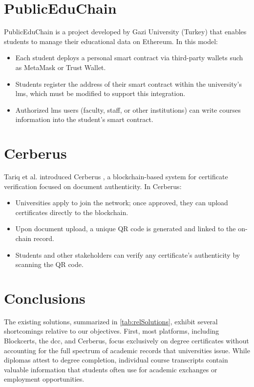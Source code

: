 \section{PublicEduChain}
PublicEduChain \cite{mustafa2024publiceduchain} is a project developed by Gazi University (Turkey) that enables students to manage their educational data on Ethereum. In this model:
\begin{itemize}
    \item Each student deploys a personal smart contract via third-party wallets such as MetaMask or Trust Wallet.
    \item Students register the address of their smart contract within the university’s \acrfull{lms}, which must be modified to support this integration.
    \item Authorized \acrshort{lms} users (faculty, staff, or other institutions) can write courses information into the student’s smart contract.
\end{itemize}

\section{Cerberus}
Tariq et al. introduced Cerberus \cite{tariq2022cerberus}, a blockchain-based system for certificate verification focused on document authenticity. In Cerberus:
\begin{itemize}
    \item Universities apply to join the network; once approved, they can upload certificates directly to the blockchain.
    \item Upon document upload, a unique QR code is generated and linked to the on-chain record.
    \item Students and other stakeholders can verify any certificate’s authenticity by scanning the QR code.
\end{itemize}

\section{Conclusions}
The existing solutions, summarized in \cref{tab:relSolutions}, exhibit several shortcomings relative to our objectives. First, most platforms, including Blockcerts, the \acrshort{dcc}, and Cerberus, focus exclusively on degree certificates without accounting for the full spectrum of academic records that universities issue. While diplomas attest to degree completion, individual course transcripts contain valuable information that students often use for academic exchanges or employment opportunities.

